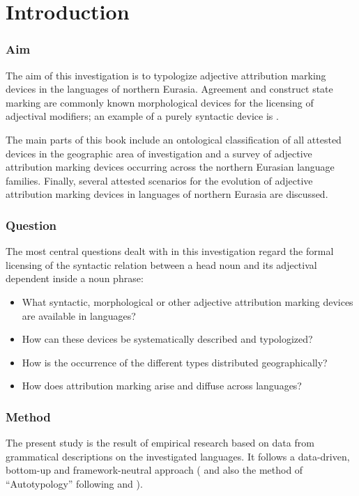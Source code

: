 
\chapter{Introduction}
\subsection*{Aim}
The aim of this investigation is to typologize adjective attribution marking devices in the languages of northern Eurasia. Agreement and construct state marking are commonly known morphological devices for the licensing of adjectival modifiers; an example of a purely syntactic device is .  

The main parts of this book include an ontological classification of all attested devices in the geographic area of investigation and a survey of adjective attribution marking devices occurring across the northern Eurasian language families. Finally, several attested scenarios for the evolution of adjective attribution marking devices in languages of northern Eurasia are discussed.

\subsection*{Question}
The most central questions dealt with in this investigation regard the formal licensing of the syntactic relation between a head noun and its adjectival dependent inside a noun phrase:
\begin{itemize}
\item What syntactic, morphological or other adjective attribution marking devices are available in languages? 
\item How can these devices be systematically described and typologized? 
\item How is the occurrence of the different types distributed geographically? 
\item How does attribution marking arise and diffuse across languages?
\end{itemize}

\subsection*{Method}
The present study is the result of empirical research based on data from grammatical descriptions on the investigated languages. It follows a data-driven, bottom-up and framework-neutral approach (\citealt[cf.][]{haspelmath2010} and also the method of “Autotypology” following \citealt{bickel-etal2002} and \citealt{bickel2007}).

